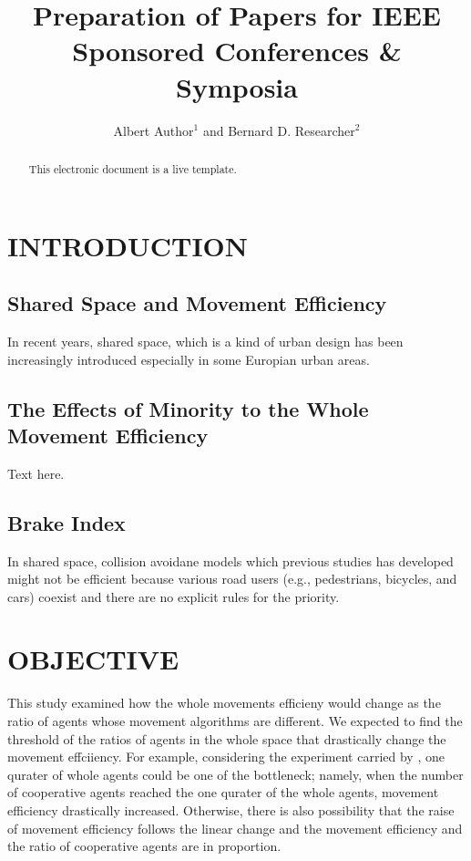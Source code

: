 \documentclass[letterpaper, 10 pt, conference]{ieeeconf}  %
\title{\LARGE \bf
Preparation of Papers for IEEE Sponsored Conferences \& Symposia
}
\author{Albert Author$^{1}$ and Bernard D. Researcher$^{2}$}
\begin{document}
\maketitle
\thispagestyle{empty}
\pagestyle{empty}


\begin{abstract}
This electronic document is a live template. 
\end{abstract}

\section{INTRODUCTION}
\subsection{Shared Space and Movement Efficiency}
In recent years, shared space, which is a kind of urban design has been increasingly introduced especially in some Europian urban areas. 

\subsection{The Effects of Minority to the Whole Movement Efficiency}
Text here.

\subsection{Brake Index}
In shared space, collision avoidane models which previous studies has developed might not be efficient because various road users (e.g., pedestrians, bicycles, and cars) coexist and there are no explicit rules for the priority.

\section{OBJECTIVE}
This study examined how the whole movements efficieny would change as the ratio of agents whose movement algorithms are different. We expected to find the threshold of the ratios of agents in the whole space that drastically change the movement effciiency. For example, considering the experiment carried by \cite{c2}, one qurater of whole agents could be one of the bottleneck; namely, when the number of cooperative agents reached the one qurater of the whole agents, movement efficiency drastically increased. Otherwise, there is also possibility that the raise of movement efficiency follows the linear change and the movement efficiency and the ratio of cooperative agents are in proportion. 
\end{document}
